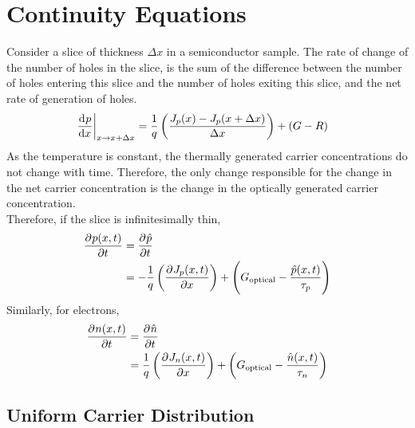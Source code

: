 \documentclass[titlepage, fleqn, a4paper, 12pt, twoside]{article}
\theoremstyle{definition}
\theoremstyle{theorem}
\let\Oldsection\section
\renewcommand{\section}{\FloatBarrier\Oldsection}
\let\Oldsubsection\subsection
\renewcommand{\subsection}{\FloatBarrier\Oldsubsection}
\begin{document}
\section{Continuity Equations}

Consider a slice of thickness $\Delta x$ in a semiconductor sample.
The rate of change of the number of holes in the slice, is the sum of the difference between the number of holes entering this slice and the number of holes exiting this slice, and the net rate of generation of holes.
\begin{align*}
	\left. \dod{p}{x} \right|_{x \to x + \Delta x} &= \frac{1}{q} \left( \frac{J_p(x) - J_p(x + \Delta x)}{\Delta x} \right) + (G - R)
\end{align*}
As the temperature is constant, the thermally generated carrier concentrations do not change with time.
Therefore, the only change responsible for the change in the net carrier concentration is the change in the optically generated carrier concentration.\\
Therefore, if the slice is infinitesimally thin,
\begin{align*}
	\dpd{p(x,t)}{t} &= \dpd{\hat{p}}{t}\\
	&= -\frac{1}{q} \left( \dpd{J_p(x,t)}{x} \right) + \left( G_{\text{optical}} - \frac{\hat{p}(x,t)}{\tau_p} \right)
\end{align*}
Similarly, for electrons,
\begin{align*}
	\dpd{n(x,t)}{t} &= \dpd{\hat{n}}{t}\\
	&= \frac{1}{q} \left( \dpd{J_n(x,t)}{x} \right) + \left( G_{\text{optical}} - \frac{\hat{n}(x,t)}{\tau_n} \right)
\end{align*}

\subsection{Uniform Carrier Distribution}
\end{document}
